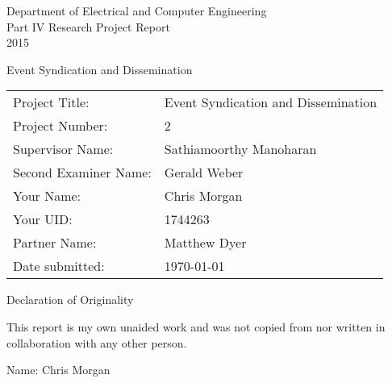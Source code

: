 \begin{titlepage}


\vspace*{15em}


\centering

{\LARGE Department of Electrical and Computer Engineering\\
Part IV Research Project Report\\
2015}

{\LARGE Event Syndication and Dissemination}

\hspace{2em}

\begin{table*}[h]
\centering
\begin{tabular}{ll}
Project Title: & Event Syndication and Dissemination \\
Project Number: & 2 \\
Supervisor Name: & Sathiamoorthy Manoharan \\
Second Examiner Name: & Gerald Weber \\
Your Name: & Chris Morgan \\
Your UID: & 1744263 \\
Partner Name: & Matthew Dyer \\
Date submitted: & \today \\

\end{tabular}
\end{table*}
\begin{table}


\end{table}
\pagebreak

\vspace*{25em}

{\Large Declaration of Originality}

\hspace{5em}

This report is my own unaided work and was not copied from 
nor written in collaboration with any other person.

Name: Chris Morgan 


\end{titlepage}
